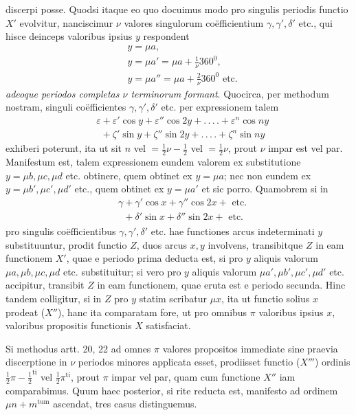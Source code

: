 discerpi posse. Quodsi itaque eo quo docuimus modo pro singulis periodis functio
$X'$ evolvitur, nanciscimur $\nu$ valores singulorum coëfficientium $\gamma,\gamma',\delta'$ etc., qui hisce deinceps valoribus ipsius $y$ respondent
\[
\begin{aligned}
&y=\mu a,\\[5pt]
& y=\mu a'=\mu a+\tfrac1\nu360^0,\\[5pt]
& y=\mu a''=\mu a+\tfrac2\nu360^0\text{ etc.}
\end{aligned}
\]
\textit{adeoque periodos completas $\nu$ terminorum formant}. Quocirca, per methodum nostram, singuli coëfficientes $\gamma,\gamma',\delta'$ etc. per expressionem talem
\[
\begin{aligned}
&\varepsilon+\varepsilon'\cos y+\varepsilon''\cos2y+.\,.\,.\,.+\varepsilon^n\cos ny\\[5pt]
&\phantom{\varepsilon}+\zeta'\sin y+\zeta''\sin2y+.\,.\,.\,.+\zeta^n\sin ny
\end{aligned}
\]
exhiberi poterunt, ita ut sit $n$ vel $=\tfrac12\nu-\tfrac12$ vel $=\tfrac12\nu$, prout $\nu$ impar est vel par. Manifestum est, talem expressionem eundem valorem ex substitutione $y=\mu b,\mu c,\mu d$ etc. obtinere, quem obtinet ex $y=\mu a$; nec non eundem ex $y=\mu b',\mu c',\mu d'$ etc., quem obtinet ex $y=\mu a'$ et sic porro. Quamobrem si in
\[
\begin{aligned}
&\gamma+\gamma'\cos x+\gamma''\cos2x+\text{ etc.}\\[5pt]
&\phantom{\gamma}+\delta'\sin x+\delta''\sin2x+\text{ etc.}
\end{aligned}
\]
pro singulis coëfficientibus $\gamma,\gamma',\delta'$ etc. hae functiones arcus indeterminati $y$ substituuntur, prodit functio $Z$, duos arcus $x,y$ involvens, transibitque $Z$ in eam functionem $X'$, quae e periodo prima deducta est, si pro $y$ aliquis valorum $\mu a,\mu b,\mu c,\mu d$ etc. substituitur; si vero pro $y$ aliquis valorum $\mu a',\mu b',\mu c',\mu d'$ etc. accipitur, transibit $Z$ in eam functionem, quae eruta est e periodo secunda. Hinc tandem colligitur, si in $Z$ pro $y$ statim scribatur $\mu x$, ita ut functio solius $x$ prodeat ($X''$), hanc ita comparatam fore, ut pro omnibus $\pi$ valoribus ipsius $x$, valoribus propositis functionis $X$ satisfaciat.

Si methodus artt. 20, 22 ad omnes $\pi$ valores propositos immediate sine praevia discerptione in $\nu$ periodos minores applicata esset, prodiisset functio ($X'''$) ordinis $\tfrac12\pi-\tfrac12^{\mathrm{ti}}$ vel $\tfrac12\pi^{\mathrm{ti}}$, prout $\pi$ impar vel par, quam cum functione $X''$ iam comparabimus. Quum haec posterior, si rite reducta est, manifesto ad ordinem $\mu n+m^{\mathrm{tum}}$ ascendat, tres casus distinguemus.

